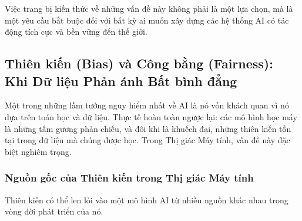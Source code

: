 Việc trang bị kiến thức về những vấn đề này không phải là một lựa chọn, mà là một yêu cầu bắt buộc đối với bất kỳ ai muốn xây dựng các hệ thống AI có tác động tích cực và bền vững đến thế giới.

\subsection{Thiên kiến (Bias) và Công bằng (Fairness): Khi Dữ liệu Phản ánh Bất bình đẳng}
\label{subsec:bias_and_fairness}

Một trong những lầm tưởng nguy hiểm nhất về AI là nó vốn khách quan vì nó dựa trên toán học và dữ liệu. Thực tế hoàn toàn ngược lại: các mô hình học máy là những tấm gương phản chiếu, và đôi khi là khuếch đại, những thiên kiến tồn tại trong dữ liệu mà chúng được học. Trong Thị giác Máy tính, vấn đề này đặc biệt nghiêm trọng.

\subsubsection{Nguồn gốc của Thiên kiến trong Thị giác Máy tính}
\label{subsubsec:sources_of_bias}
Thiên kiến có thể len lỏi vào một mô hình AI từ nhiều nguồn khác nhau trong vòng đời phát triển của nó.

